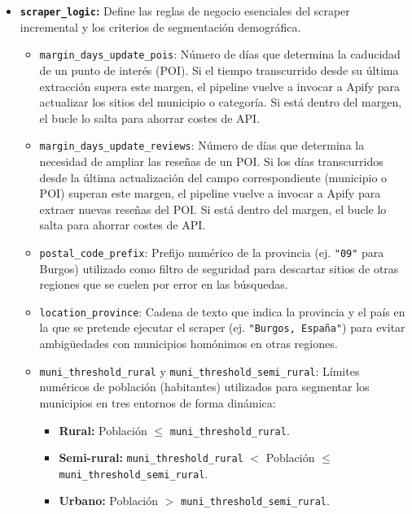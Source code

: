 \begin{itemize}
    \item \textbf{\texttt{scraper\_logic}:}
    Define las reglas de negocio esenciales del scraper incremental y los criterios de segmentación demográfica.
    \begin{itemize}
        \item \texttt{margin\_days\_update\_pois}: Número de días que determina la caducidad de un punto de interés (POI). Si el tiempo transcurrido desde su última extracción supera este margen, el pipeline vuelve a invocar a Apify para actualizar los sitios del municipio o categoría. Si está dentro del margen, el bucle lo salta para ahorrar costes de API.
        \item \texttt{margin\_days\_update\_reviews}: Número de días que determina la necesidad de ampliar las reseñas de un POI. Si los días transcurridos desde la última actualización del campo correspondiente (municipio o POI) superan este margen, el pipeline vuelve a invocar a Apify para extraer nuevas reseñas del POI. Si está dentro del margen, el bucle lo salta para ahorrar costes de API.
        \item \texttt{postal\_code\_prefix}: Prefijo numérico de la provincia (ej. \texttt{"09"} para Burgos) utilizado como filtro de seguridad para descartar sitios de otras regiones que se cuelen por error en las búsquedas.
        \item \texttt{location\_province}: Cadena de texto que indica la provincia y el país en la que se pretende ejecutar el scraper (ej. \texttt{"Burgos, España"}) para evitar ambigüedades con municipios homónimos en otras regiones.
        \item \texttt{muni\_threshold\_rural} y \texttt{muni\_threshold\_semi\_rural}: Límites numéricos de población (habitantes) utilizados para segmentar los municipios en tres entornos de forma dinámica:
        \begin{itemize}
            \item \textbf{Rural:} Población $\le$ \texttt{muni\_threshold\_rural}.
            \item \textbf{Semi-rural:} \texttt{muni\_threshold\_rural} $<$ Población $\le$ \texttt{muni\-\_threshold\_semi\_rural}.
            \item \textbf{Urbano:} Población $>$ \texttt{muni\_threshold\_semi\_rural}.
        \end{itemize}
    \end{itemize}
    

\end{itemize}
